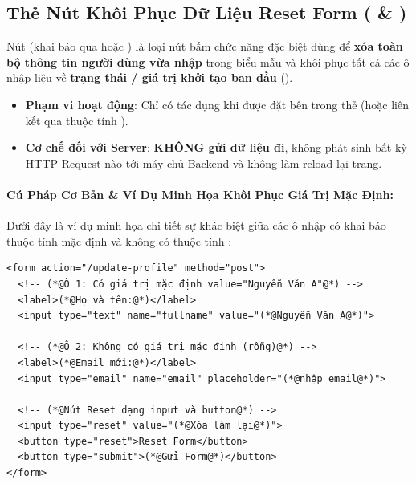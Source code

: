 \subsection{Thẻ Nút Khôi Phục Dữ Liệu Reset Form ( \& )}
\label{subsec:form_reset_button}

\begin{conceptBox}
Nút  (khai báo qua  hoặc ) là loại nút bấm chức năng đặc biệt dùng để \textbf{xóa toàn bộ thông tin người dùng vừa nhập} trong biểu mẫu và khôi phục tất cả các ô nhập liệu về \textbf{trạng thái / giá trị khởi tạo ban đầu} ().
\begin{itemize}[leftmargin=1.5em, itemsep=3pt, parsep=0pt]
    \item \textbf{Phạm vi hoạt động}: Chỉ có tác dụng khi được đặt bên trong thẻ  (hoặc liên kết qua thuộc tính ).
    \item \textbf{Cơ chế đối với Server}: \textbf{KHÔNG gửi dữ liệu đi}, không phát sinh bất kỳ HTTP Request nào tới máy chủ Backend và không làm reload lại trang.
\end{itemize}
\end{conceptBox}

\paragraph{Cú Pháp Cơ Bản \& Ví Dụ Minh Họa Khôi Phục Giá Trị Mặc Định:}

Dưới đây là ví dụ minh họa chi tiết sự khác biệt giữa các ô nhập có khai báo thuộc tính  mặc định và không có thuộc tính :

\begin{codeWindow}
\begin{lstlisting}[language=HTML5]
<form action="/update-profile" method="post">
  <!-- (*@Ô 1: Có giá trị mặc định value="Nguyễn Văn A"@*) -->
  <label>(*@Họ và tên:@*)</label>
  <input type="text" name="fullname" value="(*@Nguyễn Văn A@*)">

  <!-- (*@Ô 2: Không có giá trị mặc định (rỗng)@*) -->
  <label>(*@Email mới:@*)</label>
  <input type="email" name="email" placeholder="(*@nhập email@*)">

  <!-- (*@Nút Reset dạng input và button@*) -->
  <input type="reset" value="(*@Xóa làm lại@*)">
  <button type="reset">Reset Form</button>
  <button type="submit">(*@Gửi Form@*)</button>
</form>
\end{lstlisting}
\end{codeWindow}


